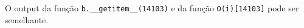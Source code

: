 \documentclass[12pt,varwidth=16cm,border=1pt]{standalone}
\begin{document}
O output da função \verb+b.__getitem__(14103)+ e da função \verb+O(i)[14103]+ pode ser semelhante.

\questiomtrue
\end{document}

